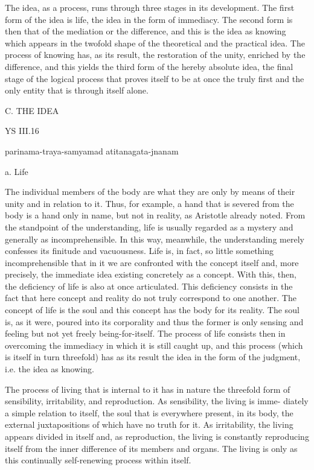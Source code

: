 The idea, as a process, runs through three stages in its development.
The first form of the idea is life, the idea in the form of immediacy.
The second form is then that of the mediation or the difference, and
this is the idea as knowing which appears in the twofold shape of
the theoretical and the practical idea.
The process of knowing has, as its result,
the restoration of the unity, enriched by the difference, and
this yields the third form of the hereby absolute idea,
the final stage of the logical process that proves itself to be at once
the truly first and the only entity that is through itself alone.

C. THE IDEA

    YS III.16

    parinama-traya-samyamad atitanagata-jnanam

    a. Life

    The individual members of the body are what they are only by means
    of their unity and in relation to it. Thus, for example, a hand that is severed
    from the body is a hand only in name, but not in reality, as
    Aristotle already noted. From the standpoint of the understanding, life is usually
    regarded as a mystery and generally as incomprehensible. In this way, meanwhile,
    the understanding merely confesses its finitude and vacuousness. Life is, in fact, so
    little something incomprehensible that in it we are confronted with the concept
    itself and, more precisely, the immediate idea existing concretely as a concept.
    With this, then, the deficiency of life is also at once articulated. This deficiency
    consists in the fact that here concept and reality do not truly correspond to one
    another. The concept of life is the soul and this concept has the body for its reality.
    The soul is, as it were, poured into its corporality and thus the former is only
    sensing and feeling but not yet freely being-for-itself. The process of
    life consists then in overcoming the immediacy in which it is still caught up, and
    this process (which is itself in turn threefold) has as its result the idea in the form
    of the judgment, i.e. the idea as knowing.

    The process of living that is internal to it has in nature the threefold
    form of sensibility, irritability, and reproduction. As sensibility, the living is imme-
    diately a simple relation to itself, the soul that is everywhere present, in its body,
    the external juxtapositions of which have no truth for it. As irritability, the living
    appears divided in itself and, as reproduction, the living is constantly reproducing
    itself from the inner difference of its members and organs. The living is only as
    this continually self-renewing process within itself.

